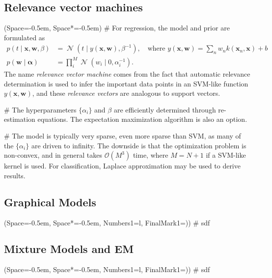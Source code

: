 \documentclass[12pt, a4paper]{article}
\newcommand{\listSpace}{-0.5em}%
\newcommand{\vect}[1]{\bm{#1}}
\DeclareMathOperator{\N}{\mathcal{N}}
\begin{document}
\subsection*{Relevance vector machines}
\begin{easylist}[itemize]
	\ListProperties(Space=\listSpace, Space*=\listSpace)
	# For regression, the model and prior are formulated as
	\begin{align*}
		p(t \mid \vect{x}, \vect{w}, \beta) &= \N (t \mid y (\vect{x}, \vect{w}), \beta^{-1}),
		\quad
		\text{where } y(\vect{x}, \vect{w}) = \sum_n w_n k(\vect{x}_n, \vect{x}) + b \\
		p(\vect{w} \mid \vect{\alpha}) &= \prod_{i}^{M} \N (w_i \mid 0 , \alpha^{-1}_i).
	\end{align*}
	The name \emph{relevance vector machine} comes from the fact that automatic relevance determination is used to infer the important data points in an SVM-like function $y(\vect{x}, \vect{w})$, and these \emph{relevance vectors} are analogous to support vectors.
	
	
	# The hyperparameters $\{\alpha_i \}$ and $\beta$ are efficiently determined through re-estimation equations.
	The expectation maximization algorithm is also an option.
	
	# The model is typically very sparse, even more sparse than SVM, as many of the $\{\alpha_i \}$ are driven to infinity.
	The downside is that the optimization problem is non-convex, and in general takes $\mathcal{O}(M^3)$ time, where $M= N+1$ if a SVM-like kernel is used.
	For classification, Laplace approximation may be used to derive results.
\end{easylist}

\subsection{Graphical Models}
\begin{easylist}[itemize]
	\ListProperties(Space=\listSpace, Space*=\listSpace, Numbers1=l, FinalMark1={)})
	# sdf
\end{easylist}

\subsection{Mixture Models and EM}
\begin{easylist}[itemize]
	\ListProperties(Space=\listSpace, Space*=\listSpace, Numbers1=l, FinalMark1={)})
	# sdf
\end{easylist}
\end{document}
